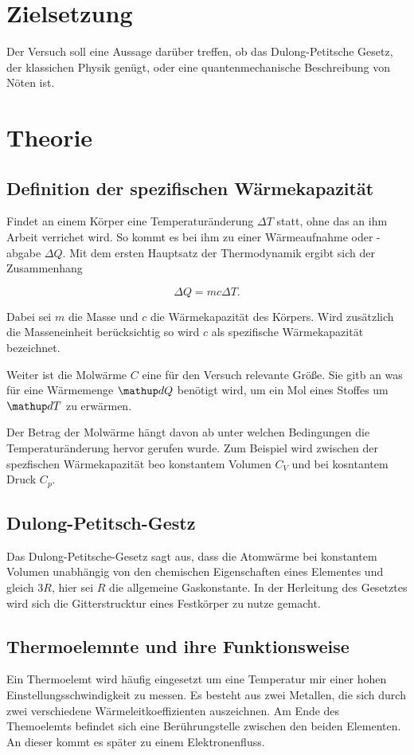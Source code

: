 \section*{Zielsetzung}
Der Versuch soll eine Aussage darüber treffen, ob das Dulong-Petitsche Gesetz, der klassichen Physik genügt, oder
eine quantenmechanische Beschreibung von Nöten ist.

\section{Theorie}

\subsection{Definition der spezifischen Wärmekapazität}

Findet an einem Körper eine Temperaturänderung $\Delta T$ statt, ohne das an ihm 
Arbeit verrichet wird. So kommt es bei ihm zu einer Wärmeaufnahme oder -abgabe $\Delta Q$.
Mit dem ersten Hauptsatz der Thermodynamik ergibt sich der Zusammenhang

\begin{equation*}
\Delta Q=m c \Delta T.
\end{equation*}

Dabei sei $m$ die Masse und $c$ die Wärmekapazität 
des Körpers.
Wird zusätzlich die Masseneinheit berücksichtig
so wird $c$ als spezifische Wärmekapazität bezeichnet.

Weiter ist die Molwärme $C$ eine für den Versuch relevante Größe.
Sie gitb an was für eine Wärmemenge $\map{d}Q$ benötigt wird,
um ein Mol eines Stoffes um $\map{d}T$ zu erwärmen.

Der Betrag der Molwärme hängt davon ab unter welchen Bedingungen 
die Temperaturänderung hervor gerufen wurde.
Zum Beispiel wird zwischen der spezfischen Wärmekapazität beo konstantem
Volumen $C_{V}$ und bei kosntantem Druck $C_{p}$.


\subsection{Dulong-Petitsch-Gestz}

Das Dulong-Petitsche-Gesetz sagt aus, dass die Atomwärme bei 
konstantem Volumen unabhängig von den chemischen Eigenschaften eines Elementes 
und gleich $3R$, hier sei $R$ die allgemeine Gaskonstante.
In der Herleitung des Gesetztes wird sich die Gitterstrucktur eines 
Festkörper zu nutze gemacht.






\subsection{Thermoelemnte und ihre Funktionsweise}

Ein Thermoelemt wird häufig eingesetzt um eine 
Temperatur mir einer hohen Einstellungsschwindigkeit zu messen.
Es besteht aus zwei Metallen, die sich durch zwei 
verschiedene Wärmeleitkoeffizienten auszeichnen.
Am Ende des Themoelemts befindet sich eine Berührungstelle zwischen 
den beiden Elementen.
An dieser kommt es später zu einem Elektronenfluss.

